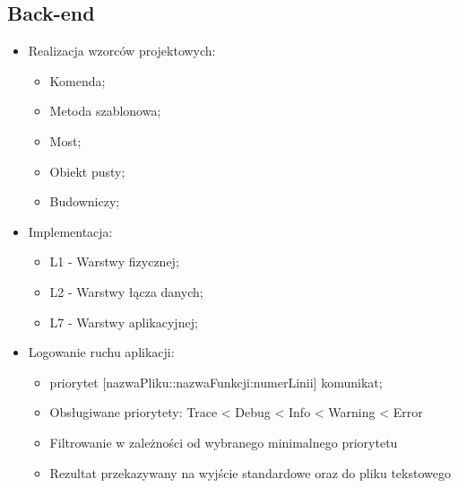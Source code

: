 	\subsection{Back-end}
	\begin{itemize}
		\item Realizacja wzorców projektowych:
		\begin{itemize}
			\item Komenda;
			\item Metoda szablonowa;
			\item Most;
			\item Obiekt pusty;
			\item Budowniczy;
		\end{itemize}
		\item Implementacja:
		\begin{itemize}
			\item L1 - Warstwy fizycznej;
			\item L2 - Warstwy łącza danych;
			\item L7 - Warstwy aplikacyjnej;
		\end{itemize}
		\item Logowanie ruchu aplikacji:
		\begin{itemize}
			\item <h:min::s::ms> priorytet [nazwaPliku::nazwaFunkcji:numerLinii] komunikat;
			\item Obsługiwane priorytety: Trace < Debug < Info <  Warning < Error
			\item Filtrowanie w zależności od wybranego minimalnego priorytetu
			\item Rezultat przekazywany na wyjście standardowe oraz do pliku tekstowego
		\end{itemize}
	\end{itemize}
